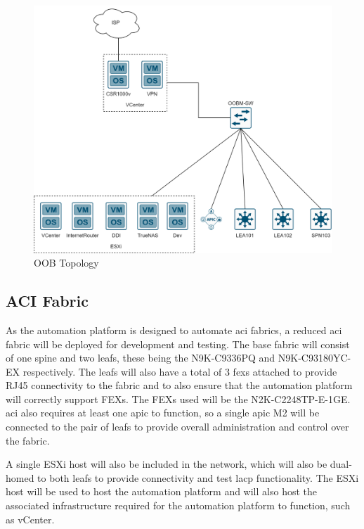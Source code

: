 \begin{figure}[H]
    \centering

    \includegraphics[scale=0.25]{images/oob-topology.png}
    \caption{OOB
        Topology}
    \label{fig:oob-topology}
\end{figure}

\subsection{ACI Fabric}
\label{design:Testbed:network-design}
As the automation platform is designed to
automate \gls{aci} fabrics, a reduced \gls{aci} fabric will be deployed for
development and testing. The base fabric will consist of one spine and two
leafs, these being the N9K-C9336PQ and N9K-C93180YC-EX respectively. The leafs
will also have a total of 3 \gls{fex}s attached to provide RJ45 connectivity to
the fabric and to also ensure that the automation platform will correctly
support FEXs. The FEXs used will be the N2K-C2248TP-E-1GE. \gls{aci} also
requires at least one \gls{apic} to function, so a single \gls{apic} M2 will be
connected to the pair of leafs to provide overall administration and control
over the fabric.

A single ESXi host will also be included in the network,
which will also be dual-homed to both leafs to provide connectivity and
test \gls{lacp} functionality. The ESXi host will be used to host the automation
platform and will also host the associated infrastructure required for the
automation platform to function, such as vCenter.

